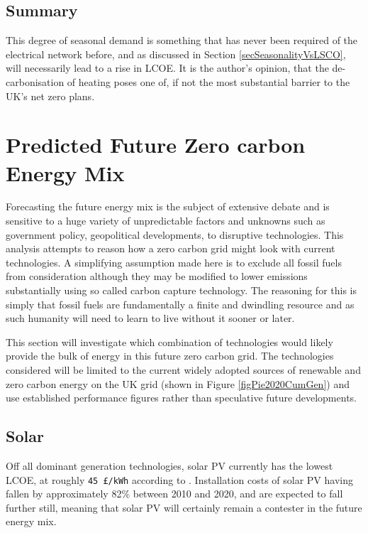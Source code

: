 \documentclass[11pt]{article}
\numberwithin{equation}{section}
\begin{document}
\subsection{Summary}
\label{sec:org2c31c4f}
This degree of seasonal demand is something that has never been required of the electrical network before, and as discussed in Section \ref{secSeasonalityVsLSCO}, will necessarily lead to a rise in LCOE. It is the author's opinion, that the de-carbonisation of heating poses one of, if not the most substantial barrier to the UK's net zero plans.

\section{Predicted Future Zero carbon Energy Mix}
\label{sec:org604b3c9}
Forecasting the future energy mix is the subject of extensive debate and is sensitive to a huge variety of unpredictable factors and unknowns such as government policy, geopolitical developments, to disruptive technologies. This analysis attempts to reason how a zero carbon grid might look with current technologies. A simplifying assumption made here is to exclude all fossil fuels from consideration although they may be modified to lower emissions substantially using so called carbon capture technology. The reasoning for this is simply that fossil fuels are fundamentally a finite and dwindling resource and as such humanity will need to learn to live without it sooner or later.

This section will investigate which combination of technologies would likely provide the bulk of energy in this future zero carbon grid. The technologies considered will be limited to the current widely adopted sources of renewable and zero carbon energy on the UK grid (shown in Figure \ref{figPie2020CumGen}) and use established performance figures rather than speculative future developments.

\subsection{Solar \label{secSolar}}
\label{sec:orge0ebf40}
Off all dominant generation technologies, solar PV currently has the lowest LCOE, at roughly \texttt{45 £/kWh} according to \cite{DeptEnerLCOE}. Installation costs of solar PV having fallen by approximately 82\% between 2010 and 2020, and are expected to fall further still, meaning that solar PV will certainly remain a contester in the future energy mix.
\end{document}
